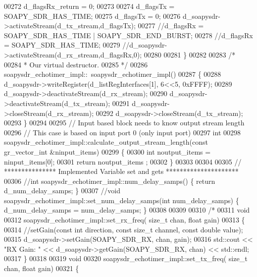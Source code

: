 \begin{DoxyCode}
00272       d_flagsRx_return = 0;
00273 
00274       d_flagsTx = SOAPY_SDR_HAS_TIME;
00275       d_flagsTx = 0;
00276       d_soapysdr->activateStream(d_tx_stream,d_flagsTx);
00277       \textcolor{comment}{//d\_flagsRx = SOAPY\_SDR\_HAS\_TIME | SOAPY\_SDR\_END\_BURST;}
00278       \textcolor{comment}{//d\_flagsRx = SOAPY\_SDR\_HAS\_TIME;}
00279       \textcolor{comment}{//d\_soapysdr->activateStream(d\_rx\_stream,d\_flagsRx,0);}
00280 
00281     \}
00282 
00283     \textcolor{comment}{/*}
00284 \textcolor{comment}{    * Our virtual destructor.}
00285 \textcolor{comment}{    */}
00286     soapysdr_echotimer_impl::~soapysdr_echotimer_impl()
00287     \{
00288       d_soapysdr->writeRegister(d_listRegInterfaces[1], 6<<5, 0xFFFF);
00289       d_soapysdr->deactivateStream(d_rx_stream);
00290       d_soapysdr->deactivateStream(d_tx_stream);
00291       d_soapysdr->closeStream(d_rx_stream);
00292       d_soapysdr->closeStream(d_tx_stream);
00293     \}
00294 
00295     \textcolor{comment}{// Input based block needs to know output stream length}
00296     \textcolor{comment}{// This case is based on input port 0 (only input port)}
00297     \textcolor{keywordtype}{int}
00298     soapysdr_echotimer_impl::calculate_output_stream_length(\textcolor{keyword}{const} gr\_vector\_int &ninput\_items)
00299     \{
00300       \textcolor{keywordtype}{int} noutput\_items = ninput\_items[0];
00301       \textcolor{keywordflow}{return} noutput\_items ;
00302     \}
00303 
00304 
00305     \textcolor{comment}{// ***************  Implemented Variable set and gets *********************}
00306     \textcolor{comment}{//int soapysdr\_echotimer\_impl::num\_delay\_samps() \{ return d\_num\_delay\_samps; \}}
00307     \textcolor{comment}{//void soapysdr\_echotimer\_impl::set\_num\_delay\_samps(int num\_delay\_samps) \{ d\_num\_delay\_samps =
       num\_delay\_samps; \}}
00308 
00309 
00310     \textcolor{comment}{/*}
00311 \textcolor{comment}{    void}
00312 \textcolor{comment}{    soapysdr\_echotimer\_impl::set\_rx\_freq( size\_t chan, float gain)}
00313 \textcolor{comment}{    \{}
00314 \textcolor{comment}{      //setGain(const int direction, const size\_t channel, const double value);}
00315 \textcolor{comment}{      d\_soapysdr->setGain(SOAPY\_SDR\_RX, chan, gain);}
00316 \textcolor{comment}{      std::cout << "RX Gain: "  << d\_soapysdr->getGain(SOAPY\_SDR\_RX, chan) << std::endl;}
00317 \textcolor{comment}{    \}}
00318 \textcolor{comment}{}
00319 \textcolor{comment}{    void}
00320 \textcolor{comment}{    soapysdr\_echotimer\_impl::set\_tx\_freq( size\_t chan, float gain)}
00321 \textcolor{comment}{    \{}

\end{DoxyCode}
